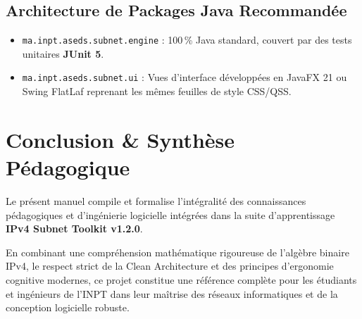 \documentclass[11pt,a4paper]{report}
\begin{document}
\section{Architecture de Packages Java Recommand\'ee}
\begin{itemize}
    \item \texttt{ma.inpt.aseds.subnet.engine} : 100\,\% Java standard, couvert par des tests unitaires \textbf{JUnit 5}.
    \item \texttt{ma.inpt.aseds.subnet.ui} : Vues d'interface d\'evelopp\'ees en JavaFX 21 ou Swing FlatLaf reprenant les m\^emes feuilles de style CSS/QSS.
\end{itemize}

\chapter*{Conclusion \& Synth\`ese P\'edagogique}
Le pr\'esent manuel compile et formalise l'int\'egralit\'e des connaissances p\'edagogiques et d'ing\'enierie logicielle int\'egr\'ees dans la suite d'apprentissage \textbf{IPv4 Subnet Toolkit v1.2.0}. 

En combinant une compr\'ehension math\'ematique rigoureuse de l'alg\`ebre binaire IPv4, le respect strict de la Clean Architecture et des principes d'ergonomie cognitive modernes, ce projet constitue une r\'ef\'erence compl\`ete pour les \'etudiants et ing\'enieurs de l'INPT dans leur ma\^itrise des r\'eseaux informatiques et de la conception logicielle robuste.
\end{document}
